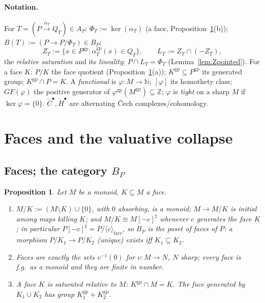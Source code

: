 \documentclass[11pt]{article}
\newtheorem{proposition}[theorem]{Proposition}
\theoremstyle{definition}
\newcommand{\gp}{\mathrm{gp}}
\newcommand{\HH}{\check{H}}
\newcommand{\cC}{\check{C}}
\newcommand{\Z}{\mathbb{Z}}
\begin{document}
\paragraph{Notation.} For $T=(P\xrightarrow{\alpha_T}Q_T)\in A_P$:
$\Phi_T:=\ker(\alpha_T)$ (a face, Proposition~\ref{prop:bp}(b));
$B(T):=(P\to P/\Phi_T)\in B_P$;
\[
Z_T:=\{x\in P^{\gp}:\alpha_T^{\gp}(x)\in Q_T\},\qquad
L_T:=Z_T\cap(-Z_T),
\]
the \emph{relative saturation} and its \emph{lineality};
$P\cap L_T=\Phi_T$ (Lemma~\ref{lem:Zpointed}). For a face $K$: $P/K$
the face quotient (Proposition~\ref{prop:bp}(a));
$K^{\gp}\subseteq P^{\gp}$ its generated group; $K^{\gp}\cap P=K$.
A \emph{functional} is $\varphi:M\to\mathbb N$; $[\varphi]$ its
homothety class; ${GF}(\varphi)$ the positive generator of
$\varphi^{\gp}(M^{\gp})\subseteq\Z$; $\varphi$ is \emph{tight} on a
sharp $M$ if $\ker\varphi=\{0\}$. $\cC^\bullet,\HH^\bullet$ are
alternating \v{C}ech complexes/cohomology.

\section{Faces and the valuative collapse}\label{sec:collapse}

\subsection{Faces; the category $B_P$}

\begin{proposition}\label{prop:bp}
Let $M$ be a monoid, $K\subseteq M$ a face.
\begin{enumerate}[label=\textup{(\alph*)},leftmargin=1.8em]
\item $M/K:=(M\setminus K)\cup\{0\}$, with $0$ absorbing, is a monoid;
$M\to M/K$ is initial among maps killing $K$; and
$M/K\cong M[-c]^{\sharp}$ whenever $c$ generates the face $K$; in
particular $P[-c]^{\sharp}=P/\langle c\rangle_{\mathrm{face}}$, so
$B_P$ is the poset of faces of $P$: a morphism $P/K_1\to P/K_2$
\textup{(}unique\textup{)} exists iff $K_1\subseteq K_2$.
\item Faces are exactly the sets $v^{-1}(0)$ for $v:M\to N$, $N$
sharp; every face is f.g.\ as a monoid and they are finite in number.
\item A face $K$ is saturated relative to $M$: $K^{\gp}\cap M=K$. The
face generated by $K_1\cup K_2$ has group $K_1^{\gp}+K_2^{\gp}$.
\end{enumerate}
\end{proposition}
\end{document}

